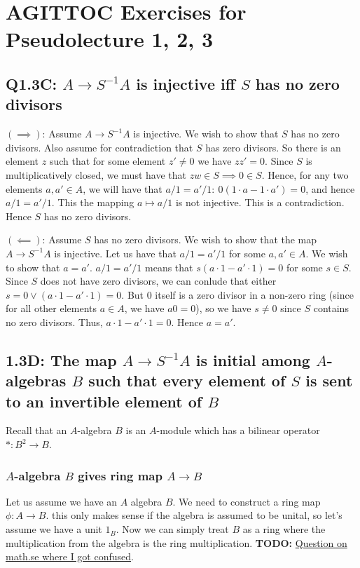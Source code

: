 \documentclass{book}
\theoremstyle{definition}
\begin{document}
\chapter{AGITTOC Exercises for Pseudolecture 1, 2, 3}
\section{Q1.3C: $A \rightarrow S^{-1}A$ is injective iff $S$ has no zero divisors}
$(\implies)$: 
Assume $A \rightarrow S^{-1}A$ is injective. We wish to show that $S$ has no 
zero divisors. Also assume for contradiction that
$S$ has zero divisors. So there is an element $z$ such that for some
element $z' \neq 0$ we have $zz' = 0$.
Since $S$ is multiplicatively closed, we must have that $zw \in S \implies 0 \in S$.
Hence, for any two elements $a, a' \in A$, we will have that $a/1 = a'/1: ~ 0(1\cdot a - 1\cdot a') = 0$,
and hence $a/1 = a'/1$. This the mapping  $a \mapsto a/1$ is not injective. This
is a contradiction. Hence $S$ has no zero divisors.

$(\impliedby)$:
Assume $S$ has no zero divisors. We wish to show that the map $A \rightarrow S^{-1}A$
is injective. Let us have that $a/1 = a'/1$ for some $a, a' \in A$. We wish to show
that $a = a'$. $a/1 = a'/1$ means that $s(a\cdot 1 - a' \cdot 1) = 0$  for some $s \in S$.
Since $S$ does not have zero divisors, we can conlude that either $s = 0 \lor (a\cdot 1 - a' \cdot 1) = 0$.
But $0$ itself is a zero divisor in a non-zero ring (since for all other elements $a \in A$, we have $a0 = 0$),
so we have $s \neq 0$ since $S$ contains no zero divisors. Thus, $a \cdot 1 - a' \cdot 1 = 0$.
Hence $a = a'$.

\section{1.3D: The map $A \rightarrow S^{-1}A$ is initial among $A$-algebras $B$ such that every element of $S$
         is sent to an invertible element of $B$}
Recall that an $A$-algebra $B$ is an $A$-module which has a bilinear operator $*: B^2 \rightarrow B$.

\subsection{$A$-algebra $B$ gives ring map $A \rightarrow B$}
Let us assume we have an $A$ algebra $B$. We need to construct a ring map $\phi: A \rightarrow B$.
this only makes sense if the algebra is assumed to be unital, so let's assume we have a unit $1_B$.
Now we can simply treat $B$ as a ring where the multiplication from the algebra is the ring multiplication.
\textbf{TODO:}
\href{https://math.stackexchange.com/questions/3756749/an-a-algebra-b-carries-the-same-data-as-a-ring-map-a-rightarrow-b}{Question on math.se where I got confused}.
\end{document}
